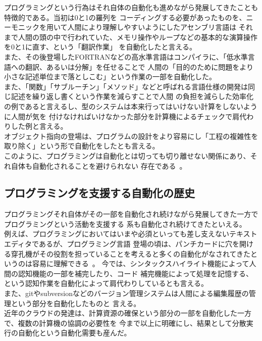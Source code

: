 \documentclass[10pt,a4paper]{ltjsarticle}       %
\begin{document}
プログラミングという行為はそれ自体の自動化も進めながら発展してきたことも特徴的である。当初は0と1の羅列を
コーディングする必要があったものを、ニーモニックを用いて人間により理解しやすいようにしたアセンブリ言語は
それまで人間の頭の中で行われていた、メモリ操作やループなどの基本的な演算操作を0と1に直す、という「翻訳作業」
を自動化したと言える。\\
また、その後登場したFORTRANなどの高水準言語はコンパイラに、「低水準言語への翻訳、あるいは分解」を任せることで
人間の「目的のために問題をより小さな記述単位まで落としこむ」という作業の一部を自動化した。\\
また、「関数」「サブルーチン」「メソッド」などと呼ばれる言語仕様の開発は同じ記述を繰り返し書くという作業を減らすことで人間
の負担を減らした効率化の例であると言えるし、型のシステムは本来行ってはいけない計算をしないように人間が気を
付けなければいけなかった部分を計算機によるチェックで肩代わりした例と言える。\\
オブジェクト指向の登場は、プログラムの設計をより容易にし「工程の複雑性を取り除く」という形で自動化をしたとも言える。\\

このように、プログラミングは自動化とは切っても切り離せない関係にあり、それ自体も自動化されることを避けられない
存在である~\cite{plmaking}。
\subsection{プログラミングを支援する自動化の歴史}
プログラミングそれ自体がその一部を自動化され続けながら発展してきた一方でプログラミングという活動を支援する
系も自動化され続けてきたといえる。\\

例えば、プログラミングにおいてはいまや必須といっても差し支えないテキストエディタであるが、プログラミング言語
登場の頃は、パンチカードに穴を開ける穿孔機がその役割を担っていることを考えると多くの自動化がなされてきたと
いうのは容易に理解できる~\cite{punchcard}。
今では、シンタックスハイライト機能によって人間の認知機能の一部を補完したり、コード
補完機能によって処理を記憶する、という認知作業を自動化によって肩代わりしているとも言える。\\
また、gitやsubversionなどのバージョン管理システムは人間による編集履歴の管理という部分を自動化したものと
言える。\\
近年のクラウドの発達は、計算資源の確保という部分の一部を自動化した一方で、複数の計算機の協調の必要性を
今まで以上に明確にし、結果として分散実行の自動化という自動化需要も産んだ。\\
\end{document}
